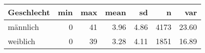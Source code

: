 
\begin{tabular}{lrrrrrr}
\toprule
Geschlecht & min & max & mean & sd & n & var\\
\midrule
männlich & 0 & 41 & 3.96 & 4.86 & 4173 & 23.60\\
weiblich & 0 & 39 & 3.28 & 4.11 & 1851 & 16.89\\
\bottomrule
\end{tabular}